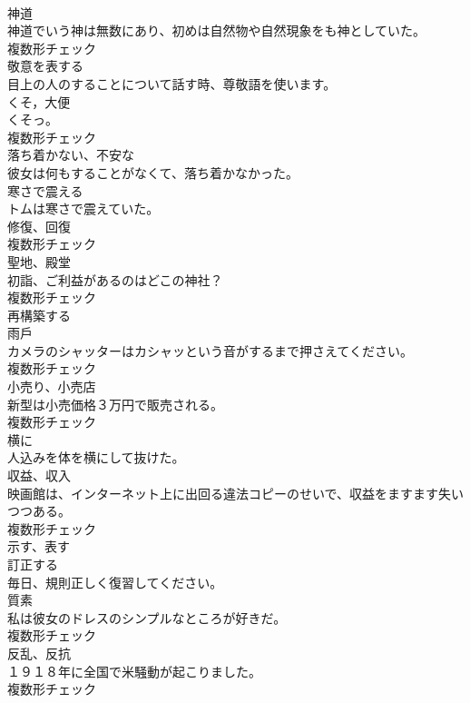 \documentclass[8pt]{extreport}
\begin{document}
\begin{CJK}{UTF8}{min}
\\	[名詞]	神道	
\\	神道でいう神は無数にあり、初めは自然物や自然現象をも神としていた。	
\\	複数形チェック
\\	[形容詞]	敬意を表する	
\\	目上の人のすることについて話す時、尊敬語を使います。	
\\	[名詞]	くそ，大便	
\\	くそっ。	
\\	複数形チェック
\\	[形容詞]	落ち着かない、不安な	
\\	彼女は何もすることがなくて、落ち着かなかった。	
\\	[動詞]	寒さで震える	
\\	トムは寒さで震えていた。	
\\	[名詞]	修復、回復	
\\	複数形チェック
\\	[名詞]	聖地、殿堂	
\\	初詣、ご利益があるのはどこの神社？	
\\	複数形チェック
\\	[動詞]	再構築する	
\\	[名詞]	雨戶	
\\	カメラのシャッターはカシャッという音がするまで押さえてください。	
\\	複数形チェック
\\	[名詞]	小売り、小売店	
\\	新型は小売価格３万円で販売される。	
\\	複数形チェック
\\	[副詞]	横に	
\\	人込みを体を横にして抜けた。	
\\	[名詞]	収益、収入	
\\	映画館は、インターネット上に出回る違法コピーのせいで、収益をますます失いつつある。	
\\	複数形チェック
\\	[動詞]	示す、表す	
\\	[動詞]	訂正する	
\\	毎日、規則正しく復習してください。	
\\	[名詞]	質素	
\\	私は彼女のドレスのシンプルなところが好きだ。	
\\	複数形チェック
\\	[名詞]	反乱、反抗	
\\	１９１８年に全国で米騒動が起こりました。	
\\	複数形チェック

\end{CJK}
\end{document}
